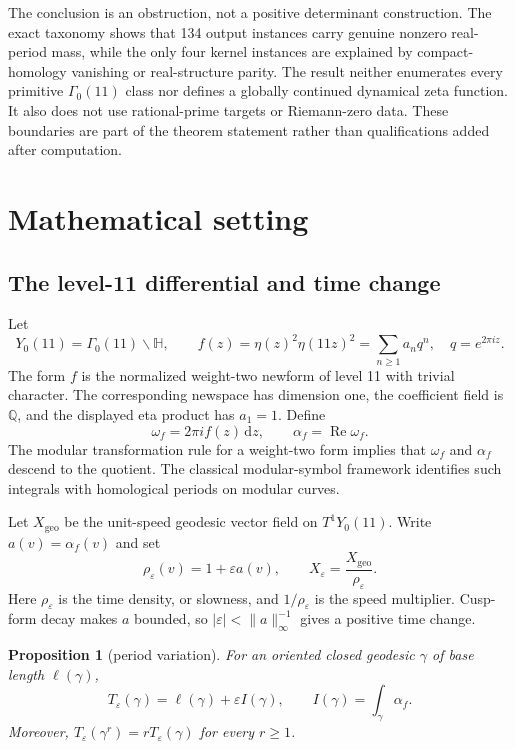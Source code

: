 \documentclass[11pt]{article}
\newtheorem{proposition}[theorem]{Proposition}
\theoremstyle{definition}
\theoremstyle{remark}
\newcommand{\G}{\Gamma_0(11)}
\newcommand{\HH}{\mathbb H}
\newcommand{\QQ}{\mathbb Q}
\newcommand{\e}{\varepsilon}
\newcommand{\dd}{\,\mathrm d}
\begin{document}
The conclusion is an obstruction, not a positive determinant construction. The exact taxonomy shows that 134 output instances carry genuine nonzero real-period mass, while the only four kernel instances are explained by compact-homology vanishing or real-structure parity. The result neither enumerates every primitive $\G$ class nor defines a globally continued dynamical zeta function. It also does not use rational-prime targets or Riemann-zero data. These boundaries are part of the theorem statement rather than qualifications added after computation.

\section{Mathematical setting}

\subsection{The level-11 differential and time change}

Let
\[
Y_0(11)=\G\backslash\HH,
\qquad
f(z)=\eta(z)^2\eta(11z)^2=\sum_{n\geq1}a_nq^n,
\quad q=e^{2\pi iz}.
\]
The form $f$ is the normalized weight-two newform of level 11 with trivial character. The corresponding newspace has dimension one, the coefficient field is $\QQ$, and the displayed eta product has $a_1=1$.
\citep[Properties and q-expansion]{lmfdb112aa}
Define
\[
\omega_f=2\pi i f(z)\dd z,
\qquad
\alpha_f=\operatorname{Re}\omega_f.
\]
The modular transformation rule for a weight-two form implies that $\omega_f$ and $\alpha_f$ descend to the quotient. The classical modular-symbol framework identifies such integrals with homological periods on modular curves.
\citep[pp.~19--25]{manin1972}

Let $X_{\mathrm{geo}}$ be the unit-speed geodesic vector field on $T^1Y_0(11)$. Write $a(v)=\alpha_f(v)$ and set
\[
\rho_\e(v)=1+\e a(v),
\qquad
X_\e=\frac{X_{\mathrm{geo}}}{\rho_\e}.
\]
Here $\rho_\e$ is the time density, or slowness, and $1/\rho_\e$ is the speed multiplier. Cusp-form decay makes $a$ bounded, so $|\e|<\lVert a\rVert_\infty^{-1}$ gives a positive time change.

\begin{proposition}[period variation]\label{prop:period}
For an oriented closed geodesic $\gamma$ of base length $\ell(\gamma)$,
\[
T_\e(\gamma)=\ell(\gamma)+\e I(\gamma),
\qquad
I(\gamma)=\int_\gamma\alpha_f.
\]
Moreover, $T_\e(\gamma^r)=rT_\e(\gamma)$ for every $r\geq1$.
\end{proposition}
\end{document}
